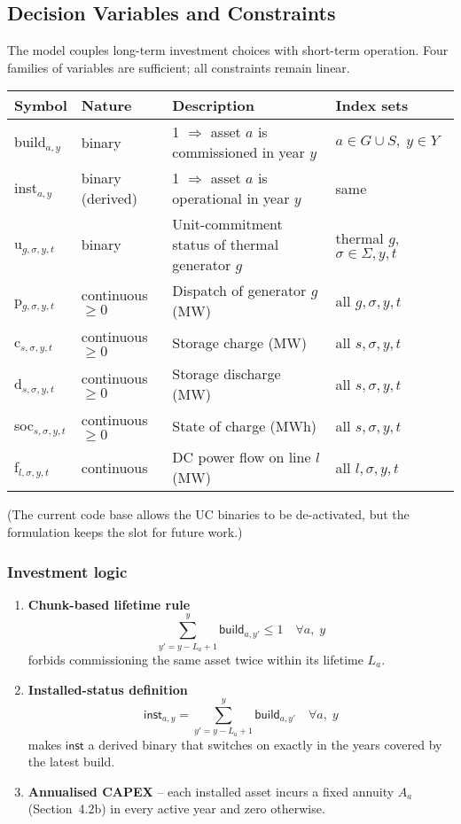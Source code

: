 \subsection{Decision Variables and Constraints}
\label{sec:decision-variables}

The model couples long-term investment choices with short-term operation. Four families of variables are sufficient; all constraints remain linear.

\begin{center}
\begin{tabular}{llll}
Symbol & Nature & Description & Index sets \\
\hline
\textsf{build}\(_{a,y}\) & binary & 1 $\Rightarrow$ asset $a$ is commissioned in year $y$ & $a \in G \cup S,\;y \in Y$ \\
\textsf{inst}\(_{a,y}\) & binary (derived) & 1 $\Rightarrow$ asset $a$ is operational in year $y$ & same \\
u\(_{g,\sigma,y,t}\) & binary & Unit-commitment status of thermal generator $g$ & thermal $g$, $\sigma \in \Sigma, y, t$ \\
p\(_{g,\sigma,y,t}\) & continuous $\geq 0$ & Dispatch of generator $g$ (MW) & all $g,\sigma,y,t$ \\
c\(_{s,\sigma,y,t}\) & continuous $\geq 0$ & Storage charge (MW) & all $s,\sigma,y,t$ \\
d\(_{s,\sigma,y,t}\) & continuous $\geq 0$ & Storage discharge (MW) & all $s,\sigma,y,t$ \\
\textsf{soc}\(_{s,\sigma,y,t}\) & continuous $\geq 0$ & State of charge (MWh) & all $s,\sigma,y,t$ \\
f\(_{l,\sigma,y,t}\) & continuous & DC power flow on line $l$ (MW) & all $l,\sigma,y,t$ \\
\end{tabular}
\end{center}

(The current code base allows the UC binaries to be de-activated, but the formulation keeps the slot for future work.)

\subsubsection{Investment logic}
\begin{enumerate}
    \item \textbf{Chunk-based lifetime rule}
    \[
    \sum_{y'=y-L_a+1}^{y}\textsf{build}_{a,y'}\le 1
    \quad\forall a,\;y
    \]
    forbids commissioning the same asset twice within its lifetime $L_a$.
    \item \textbf{Installed-status definition}
    \[
    \textsf{inst}_{a,y}= \sum_{y'=y-L_a+1}^{y}\textsf{build}_{a,y'}
    \quad\forall a,\;y
    \]
    makes $\textsf{inst}$ a derived binary that switches on exactly in the years covered by the latest build.
    \item \textbf{Annualised CAPEX} – each installed asset incurs a fixed annuity $A_a$ (Section~4.2b) in every active year and zero otherwise.
\end{enumerate}

